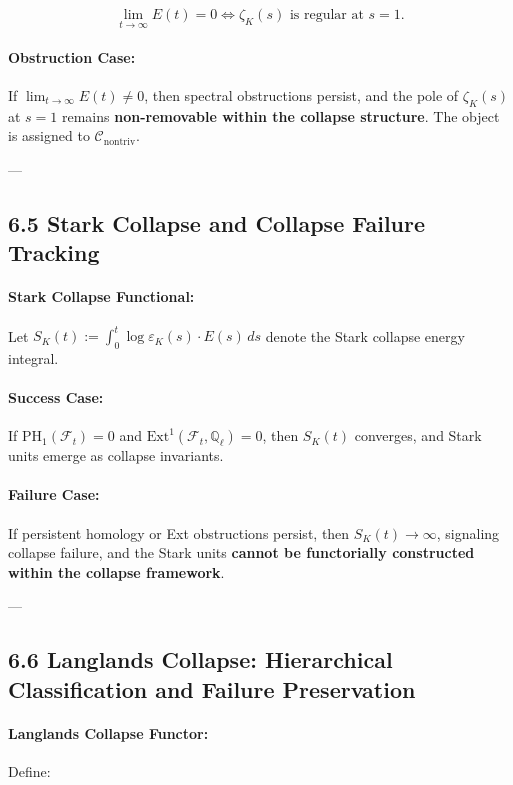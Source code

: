 \documentclass[11pt]{article}
\begin{document}
\[
\lim_{t \to \infty} E(t) = 0 \iff \zeta_K(s) \text{ is regular at } s = 1.
\]

\paragraph{Obstruction Case:}
If \( \lim_{t \to \infty} E(t) \neq 0 \), then spectral obstructions persist, and the pole of \( \zeta_K(s) \) at \( s = 1 \) remains \textbf{non-removable within the collapse structure}. The object is assigned to \( \mathcal{C}_{\mathrm{nontriv}} \).

---

\subsection*{6.5 Stark Collapse and Collapse Failure Tracking}

\paragraph{Stark Collapse Functional:}
Let \( S_K(t) := \int_0^t \log \varepsilon_K(s) \cdot E(s) \, ds \) denote the Stark collapse energy integral.

\paragraph{Success Case:}
If \( \mathrm{PH}_1(\mathcal{F}_t) = 0 \) and \( \mathrm{Ext}^1(\mathcal{F}_t, \mathbb{Q}_\ell) = 0 \), then \( S_K(t) \) converges, and Stark units emerge as collapse invariants.

\paragraph{Failure Case:}
If persistent homology or Ext obstructions persist, then \( S_K(t) \to \infty \), signaling collapse failure, and the Stark units \textbf{cannot be functorially constructed within the collapse framework}.

---

\subsection*{6.6 Langlands Collapse: Hierarchical Classification and Failure Preservation}

\paragraph{Langlands Collapse Functor:}
Define:
\end{document}
